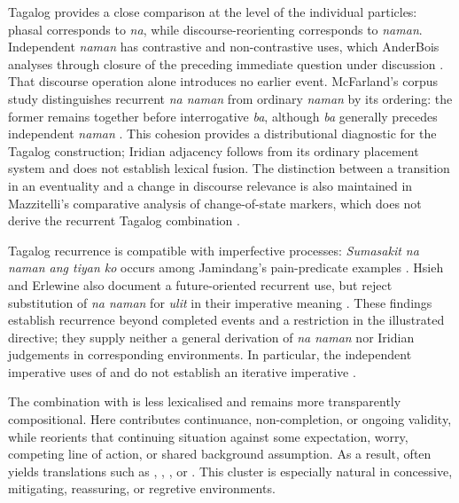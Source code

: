 Tagalog provides a close comparison at the level of the individual particles:
phasal  corresponds to \textit{na}, while discourse-reorienting
 corresponds to \textit{naman}. Independent \textit{naman} has
contrastive and non-contrastive uses, which AnderBois analyses through closure
of the preceding immediate question under discussion
\cite[§4]{anderbois2016naman}. That discourse operation alone introduces no
earlier event. McFarland's corpus study distinguishes recurrent
\textit{na naman} from ordinary \textit{naman} by its ordering: the former
remains together before interrogative \textit{ba}, although \textit{ba}
generally precedes independent \textit{naman}
\cite[pp.~1, 4]{mcfarland2001enclitics}. This cohesion provides a distributional
diagnostic for the Tagalog construction; Iridian adjacency follows from its
ordinary placement system and does not establish lexical fusion. The
distinction between a transition in an eventuality and a change
in discourse relevance is also maintained in Mazzitelli's comparative
analysis of change-of-state markers, which does not derive the recurrent
Tagalog combination \cite[§§2.1, 5]{mazzitelli2025aspect}.

Tagalog recurrence is compatible with imperfective processes:
\textit{Sumasakit na naman ang tiyan ko} 
occurs among Jamindang's pain-predicate examples
\cite[pp.~88--89]{jamindang2022sakit}. Hsieh and Erlewine also document a
future-oriented recurrent use, but reject substitution of \textit{na naman}
for \textit{ulit} in their imperative meaning 
\cite[§6.3, examples~36--37]{hsieherlewine2023nthu}.
These findings establish recurrence beyond completed events and a restriction
in the illustrated directive; they supply neither a general derivation of
\textit{na naman} nor Iridian judgements in corresponding environments.
In particular, the independent imperative uses of  and 
do not establish an iterative imperative .

The combination with  is less lexicalised and remains more transparently
compositional. Here  contributes continuance, non-completion, or
ongoing validity, while  reorients that continuing situation against
some expectation, worry, competing line of action, or shared background
assumption. As a result,  often yields translations such as
, , , or
. This cluster is especially natural in concessive,
mitigating, reassuring, or regretive environments.

